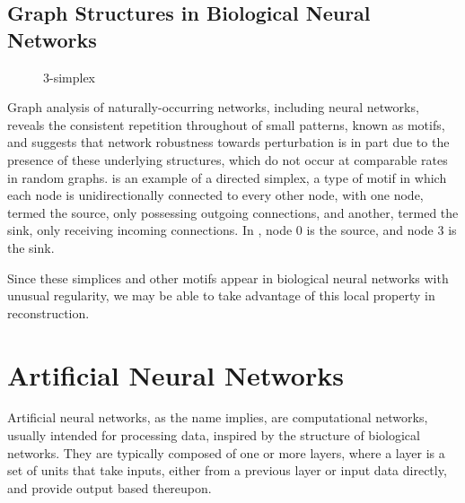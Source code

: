 \subsection{Graph Structures in Biological Neural Networks}
\label{subsec:motifs}
\begin{wrapfigure}[6]{l}{.3\textwidth}
	\centering
	\vspace{-12pt}
	{\scalebox{.9}{}}
	\caption{3-simplex}
	\label{fig:3simplex}
\end{wrapfigure}
Graph analysis of naturally-occurring networks, including neural networks, 
reveals the consistent repetition throughout of small patterns, known as motifs, 
and suggests that network robustness towards perturbation is in part due to the 
presence of these underlying structures, which do not occur at comparable rates 
in random graphs.\cite{Milo842, netmotifs-robustness}  is an 
example of a directed simplex, a type of motif in which each node is 
unidirectionally connected to every other node, with one node, termed the 
source, only possessing outgoing connections, and another, termed the sink, only 
receiving incoming connections.  In , node 0 is the source, 
and node 3 is the sink.

Since these simplices and other motifs appear in biological neural networks with 
unusual regularity\cite{Reimann2017}, we may be able to take advantage of this 
local property in reconstruction.



\section{Artificial Neural Networks}
Artificial neural networks, as the name implies, are computational networks, 
usually intended for processing data, inspired by the structure of biological 
networks. They are typically composed of one or more layers, where a layer is a 
set of units that take inputs, either from a previous layer or input data 
directly, and provide output based thereupon. 

